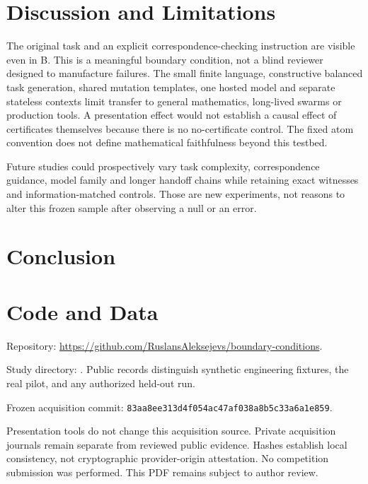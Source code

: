 \documentclass[10pt]{article}
\newcommand{\code}[1]{\texttt{#1}}
\begin{document}
\section{Discussion and Limitations}
\DiscussionResults\par
The original task and an explicit correspondence-checking instruction are visible
even in B. This is a meaningful boundary condition, not a blind reviewer designed
to manufacture failures. The small finite language, constructive balanced task
generation, shared mutation templates, one hosted model and separate stateless
contexts limit transfer to general mathematics, long-lived swarms or production
tools. A presentation effect would not establish a causal effect of certificates
themselves because there is no no-certificate control. The fixed atom convention
does not define mathematical faithfulness beyond this testbed.

Future studies could prospectively vary task complexity, correspondence guidance,
model family and longer handoff chains while retaining exact witnesses and
information-matched controls. Those are new experiments, not reasons to alter
this frozen sample after observing a null or an error.

\section{Conclusion}
\ConclusionResults\par

\section*{Code and Data}
Repository: \url{https://github.com/RuslansAleksejevs/boundary-conditions}.\par
Study directory: . Public records distinguish
synthetic engineering fixtures, the real pilot, and any authorized held-out run.\par
Frozen acquisition commit: \code{83aa8ee313d4f054ac47af038a8b5c33a6a1e859}.\par
Presentation tools do not change this acquisition source.
Private acquisition journals remain separate from reviewed public evidence.
Hashes establish local consistency, not cryptographic provider-origin attestation.
No competition submission was performed. This PDF remains subject to author review.
\end{document}
